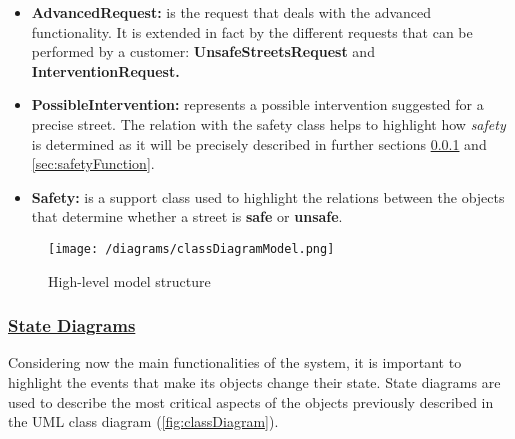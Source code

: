 \begin{itemize}
		\item \textbf{AdvancedRequest:} is the request that deals with the advanced functionality. It is extended in fact by the different requests that can be performed by a customer: \textbf{UnsafeStreetsRequest} and \textbf{InterventionRequest.}
		
		\item \textbf{PossibleIntervention:} represents a possible intervention suggested for a precise street. The relation with the safety class helps to highlight how \emph{safety} is determined as it will be precisely described in further sections \ref{sec:stateDiagrams} and \ref{sec:safetyFunction}.
		
		\item \textbf{Safety:} is a support class used to highlight the relations between the objects that determine whether a street is \textbf{safe} or \textbf{unsafe}.
	\end{itemize}
	
	\begin{figure}[h!]
		\centering
		\texttt{[image: /diagrams/classDiagramModel.png]}
		\caption{\label{fig:classDiagram}High-level model structure}
	\end{figure}

	\FloatBarrier
	
	\subsubsection[State Diagrams]{\hyperlink{toc}{State Diagrams}}
	\label{sec:stateDiagrams}
		Considering now the main functionalities of the system, it is important to highlight the events that make its objects change their state. State diagrams are used to describe the most critical aspects of the objects previously described in the UML class diagram (\autoref{fig:classDiagram}).
		
